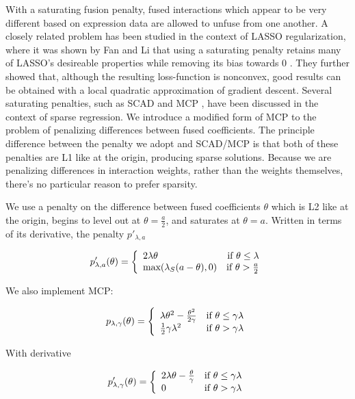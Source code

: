 \documentclass[11pt]{article}
\begin{document}
With a saturating fusion penalty, fused interactions which appear to be very different based on expression data are allowed to unfuse from one another. A closely related problem has been studied in the context of LASSO regularization, where it was shown by Fan and Li that using a saturating penalty retains many of LASSO's desireable properties while removing its bias towards 0 \cite{fan2001variable}. They further showed that, although the resulting loss-function is nonconvex, good results can be obtained with a local quadratic approximation of gradient descent. Several saturating penalties, such as SCAD \cite{fan2001variable} and MCP \cite{zhang2010nearly}, have been discussed in the context of sparse regression. We introduce a modified form of MCP to the problem of penalizing differences between fused coefficients. The principle difference between the penalty we adopt and SCAD/MCP is that both of these penalties are L1 like at the origin, producing sparse solutions. Because we are penalizing differences in interaction weights, rather than the weights themselves, there's no particular reason to prefer sparsity. 

We use a penalty on the difference between fused coefficients $\theta$ which is L2 like at the origin, begins to level out at $\theta = \frac{a}{2}$, and saturates at $\theta = a$. Written in terms of its derivative, the penalty $p'_{\lambda, a}$

\begin{equation}
p'_{\lambda,a}(\theta) = \left\{
    \begin{array}{lr}
    2\lambda\theta & \text{if } \theta \leq \lambda\\
    \text{max}(\lambda_S(a-\theta),0) & \text{if } \theta > {a \over 2}
    \end{array}
    \right.
\end{equation}

We also implement MCP:

\begin{equation}
p_{\lambda,\gamma}(\theta) = \left\{
    \begin{array}{lr}
    \lambda\theta^2-{ \theta^2 \over 2\gamma} & \text{if } \theta \leq \gamma\lambda\\
    {1 \over 2}\gamma\lambda^2 & \text{if } \theta > \gamma\lambda
    \end{array}
    \right. 
\end{equation}

With derivative

\begin{equation}
p'_{\lambda,\gamma}(\theta) = \left\{
    \begin{array}{lr}
    2\lambda\theta - {\theta \over \gamma} & \text{if } \theta \leq \gamma\lambda\\
    0 & \text{if } \theta > \gamma\lambda
    \end{array}
    \right.
\end{equation}
    
\end{document}
